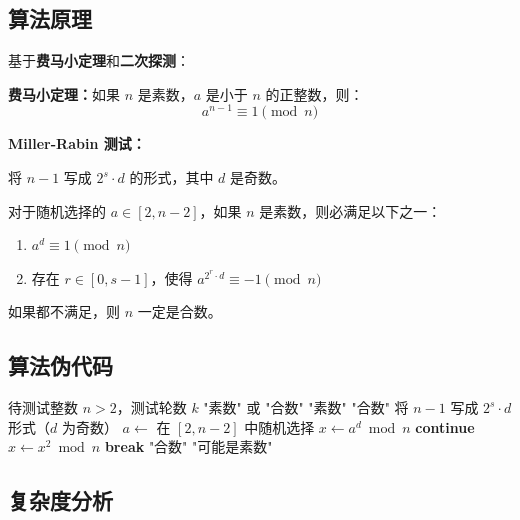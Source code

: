 \documentclass[UTF8,12pt,a4paper]{ctexart}
\begin{document}
\subsection*{算法原理}

基于\textbf{费马小定理}和\textbf{二次探测}：

\textbf{费马小定理：}如果 $n$ 是素数，$a$ 是小于 $n$ 的正整数，则：
$$a^{n-1} \equiv 1 \pmod{n}$$

\textbf{Miller-Rabin 测试：}

将 $n - 1$ 写成 $2^s \cdot d$ 的形式，其中 $d$ 是奇数。

对于随机选择的 $a \in [2, n-2]$，如果 $n$ 是素数，则必满足以下之一：
\begin{enumerate}
	\item $a^d \equiv 1 \pmod{n}$
	\item 存在 $r \in [0, s-1]$，使得 $a^{2^r \cdot d} \equiv -1 \pmod{n}$
\end{enumerate}

如果都不满足，则 $n$ 一定是合数。

\subsection*{算法伪代码}

\begin{algorithm}[H]
	\caption{Miller-Rabin 素数测试}
	\begin{algorithmic}[1]
		\Require 待测试整数 $n > 2$，测试轮数 $k$
		\Ensure "素数" 或 "合数"
			\State \Return "素数"
		\EndIf
			\State \Return "合数"
		\EndIf
		\State 将 $n - 1$ 写成 $2^s \cdot d$ 形式（$d$ 为奇数）
		 
			\State $a \gets$ 在 $[2, n-2]$ 中随机选择
			\State $x \gets a^d \bmod n$ 
				\State \textbf{continue} 
			\EndIf
				\State $x \gets x^2 \bmod n$
					\State \textbf{break} 
				\EndIf
			\EndFor
				\State \Return "合数" 
			\EndIf
		\EndFor
		\State \Return "可能是素数"
	\end{algorithmic}
\end{algorithm}

\subsection*{复杂度分析}
\end{document}
